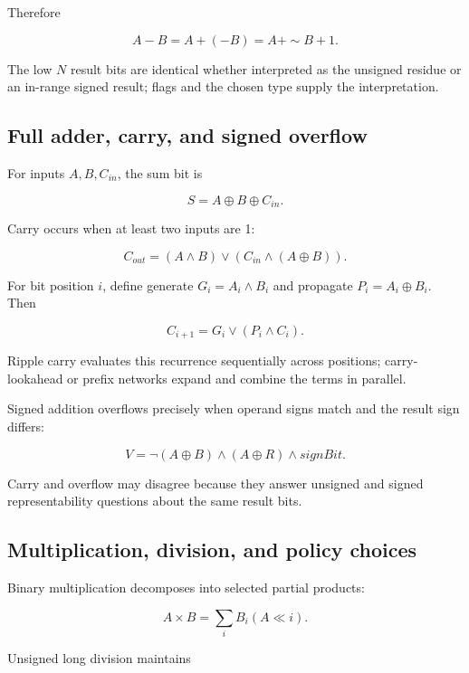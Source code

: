 Therefore

\[
A-B=A+(-B)=A+\sim B+1.
\]

The low \(N\) result bits are identical whether interpreted as the unsigned residue or an in-range signed result; flags and the chosen type supply the interpretation.

\subsection{Full adder, carry, and signed overflow}\label{03-visual-computing-i-ch018-full-adder-carry-and-signed-overflow}

\hypertarget{03-visual-computing-i-ch018-full-adder-carry-and-signed-overflow}{}

For inputs \(A,B,C_{in}\), the sum bit is

\[
S=A\oplus B\oplus C_{in}.
\]

Carry occurs when at least two inputs are 1:

\[
C_{out}=(A\land B)\lor(C_{in}\land(A\oplus B)).
\]

For bit position \(i\), define generate \(G_i=A_i\land B_i\) and propagate \(P_i=A_i\oplus B_i\). Then

\[
C_{i+1}=G_i\lor(P_i\land C_i).
\]

Ripple carry evaluates this recurrence sequentially across positions; carry-lookahead or prefix networks expand and combine the terms in parallel.

Signed addition overflows precisely when operand signs match and the result sign differs:

\[
V=\neg(A\oplus B)\land(A\oplus R)\land signBit.
\]

Carry and overflow may disagree because they answer unsigned and signed representability questions about the same result bits.

\subsection{Multiplication, division, and policy choices}\label{03-visual-computing-i-ch018-multiplication-division-and-policy-choices}

\hypertarget{03-visual-computing-i-ch018-multiplication-division-and-policy-choices}{}

Binary multiplication decomposes into selected partial products:

\[
A\times B=\sum_i B_i(A\ll i).
\]

Unsigned long division maintains

